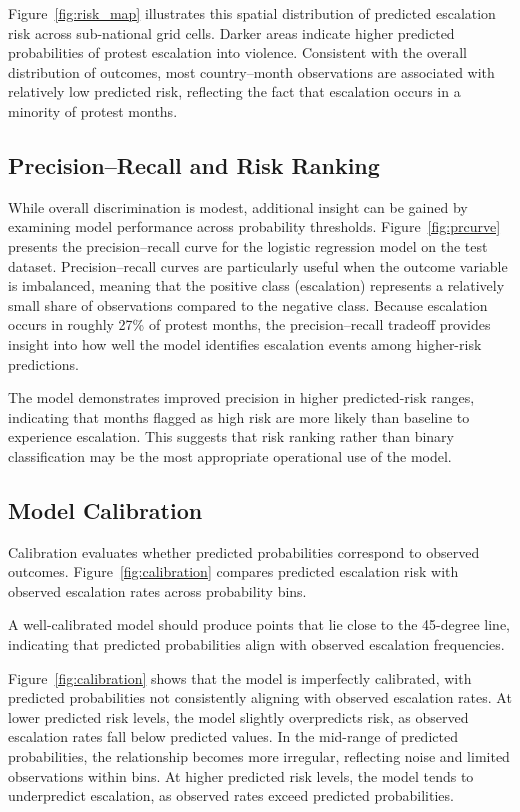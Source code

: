 \documentclass[12pt]{article}
\begin{document}
Figure~\ref{fig:risk_map} illustrates this spatial distribution of predicted escalation risk across sub-national grid cells. Darker areas indicate higher predicted probabilities of protest escalation into violence. Consistent with the overall distribution of outcomes, most country–month observations are associated with relatively low predicted risk, reflecting the fact that escalation occurs in a minority of protest months.

\subsection{Precision--Recall and Risk Ranking}
\label{sec:pr}

While overall discrimination is modest, additional insight can be gained by examining model performance across probability thresholds. Figure~\ref{fig:prcurve} presents the precision--recall curve for the logistic 
regression model on the test dataset. Precision--recall curves are particularly 
useful when the outcome variable is imbalanced, meaning that the positive class (escalation) represents a relatively small share of observations compared to the negative class. Because escalation occurs in 
roughly 27\% of protest months, the precision--recall tradeoff provides insight 
into how well the model identifies escalation events among higher-risk 
predictions.


The model demonstrates improved precision in higher predicted-risk ranges, indicating that months flagged as high risk are more likely than baseline to experience escalation. This suggests that risk ranking rather than binary classification may be the most appropriate operational use of the model.

\subsection{Model Calibration}
\label{sec:model_cali}

Calibration evaluates whether predicted probabilities correspond to observed 
outcomes. Figure~\ref{fig:calibration} compares predicted escalation risk with 
observed escalation rates across probability bins.

A well-calibrated model should produce points that lie close to the 45-degree line, indicating that predicted probabilities align with observed escalation 
frequencies.

Figure~\ref{fig:calibration} shows that the model is imperfectly calibrated, with predicted probabilities not consistently aligning with observed escalation rates. At lower predicted risk levels, the model slightly overpredicts risk, as observed escalation rates fall below predicted values. In the mid-range of predicted probabilities, the relationship becomes more irregular, reflecting noise and limited observations within bins. At higher predicted risk levels, the model tends to underpredict escalation, as observed rates exceed predicted probabilities.
\end{document}
